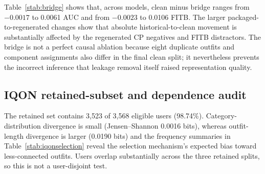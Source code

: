 \documentclass[preprint,12pt]{elsarticle}
\begin{document}
Table~\ref{stab:bridge} shows that, across models, clean minus bridge ranges from $-0.0017$ to 0.0061 AUC and from $-0.0023$ to 0.0106 FITB. The larger packaged-to-regenerated changes show that absolute historical-to-clean movement is substantially affected by the regenerated CP negatives and FITB distractors. The bridge is not a perfect causal ablation because eight duplicate outfits and component assignments also differ in the final clean split; it nevertheless prevents the incorrect inference that leakage removal itself raised representation quality.

\subsection{IQON retained-subset and dependence audit}

\begin{table}[htbp]
\caption{Post-audit comparison of retained and excluded valid IQON source outfits. Source-user activity and item frequency are computed from the full valid archive.}
\label{stab:iqonselection}
\centering\small
{}
\end{table}

The retained set contains 3,523 of 3,568 eligible users (98.74\%). Category-distribution divergence is small (Jensen--Shannon 0.0016 bits), whereas outfit-length divergence is larger (0.0190 bits) and the frequency summaries in Table~\ref{stab:iqonselection} reveal the selection mechanism's expected bias toward less-connected outfits. Users overlap substantially across the three retained splits, so this is not a user-disjoint test.
\end{document}
